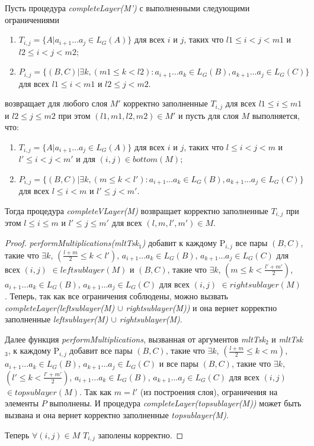 \begin{lm}
Пусть процедура \textit{completeLayer(M')} с выполненными следующими ограничениями
\begin{enumerate}
  \item $T_{i, j} = \{ A |  a_{i + 1} \dots a_{j} \in L_G(A)\}$ для всех $i$ и $j$, таких что $l1 \leq i < j < m1$ и $l2 \leq i < j < m2$;
  \item $P_{i, j} =  \{ (B, C) |\exists k, (m1 \le k < l2): a_{i + 1} \dots a_{k} \in L_G(B), a_{k + 1} \dots a_{j} \in L_G(C)\}$ для всех $l1 \leq i < m1$ и $l2 \leq j < m2$.
\end{enumerate}
возвращает для любого слоя $M'$ корректно заполненные $T_{i, j}$ для всех $l1 \leq i \le m1$ и $l2 \leq j \le m2$ при этом $(l1, m1, l2, m2) \in M'$
и пусть для слоя $M$ выполняется, что:
\begin{enumerate}
  \item $T_{i, j} = \{ A |  a_{i + 1} \dots a_{j} \in L_G(A)\}$ для всех $i$ и $j$, таких что $l \leq i < j < m$ и $l' \leq i < j < m'$ и для $(i, j) \in bottom(M)$;
  \item $P_{i, j} =  \{ (B, C) |\exists k, (m \le k < l'): a_{i + 1} \dots a_{k} \in L_G(B), a_{k + 1} \dots a_{j} \in L_G(C)\}$ для всех $l \leq i < m$ и $l' \leq j < m'$.
\end{enumerate}

Тогда процедура \textit{completeVLayer(M)} возвращает корректно заполненные $T_{i, j}$ при этом $l \leq i \le m$ и $l' \leq j \le m'$ для всех $(l, m, l', m') \in M$.
\end{lm}

\begin{proof}

\textit{performMultiplications(mltTsk$_1$)} добавит к каждому P$_{i,j}$ все пары
$(B, C)$, такие что $\exists k$, $(\frac{l+m}{2} \le k < l')$, $a_{i + 1} \dots a_{k} \in L_{G}(B)$, $a_{k + 1} \dots a_{j} \in L_{G}(C)$ для всех $(i, j)$ $\in leftsublayer(M)$
и
$(B, C)$, такие что $\exists k$, $(m \le k < \frac{l'+m'}{2})$, $a_{i + 1} \dots a_{k} \in L_{G}(B)$, $a_{k + 1} \dots a_{j} \in L_{G}(C)$ для всех $(i, j)$ $\in rightsublayer(M)$.
Теперь, так как все ограничения соблюдены, можно вызвать \textit{completeLayer(leftsublayer(M) $\cup$ rightsublayer(M))} и она вернет корректно заполненные \textit{leftsublayer(M) $\cup$ rightsublayer(M)}.

Далее функция \textit{performMultiplications}, вызванная от аргументов
\textit{mltTsk$_2$} и \textit{mltTsk$_3$}, к каждому P$_{i,j}$ добавит все пары
$(B, C)$, такие что $\exists k$, $(\frac{l+m}{2} \le k < m)$, $a_{i + 1} \dots a_{k} \in L_{G}(B)$, $a_{k + 1} \dots a_{j} \in L_{G}(C)$
и все пары
$(B, C)$, такие что $\exists k$, $(l' \le k < \frac{l'+m'}{2})$, $a_{i + 1} \dots a_{k} \in L_{G}(B)$, $a_{k + 1} \dots a_{j} \in L_{G}(C)$
для всех $(i, j)$ $\in topsublayer(M)$.
Так как $m = l'$ (из построения слоя), ограничения на элементы $P$ выполнены.
И процедура \textit{completeLayer(topsublayer(M))} может быть вызвана и она вернет корректно заполненные \textit{topsublayer(M)}.

Теперь $\forall (i, j) \in M$ $T_{i, j}$ заполены корректно.

\end{proof}

